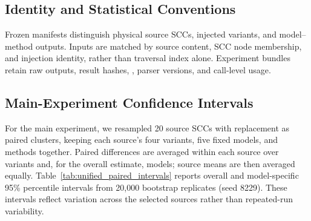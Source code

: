 \subsection{Identity and Statistical Conventions}
\label{app:revision_provenance}

Frozen manifests distinguish physical source SCCs, injected variants, and model--method outputs. Inputs are matched by source content, SCC node membership, and injection identity, rather than traversal index alone. Experiment bundles retain raw outputs, result hashes, , parser versions, and call-level usage.


\begin{revadded}
\ifrevisionmarks\else\newpage\fi
\subsection{Main-Experiment Confidence Intervals}
\label{app:main_confidence_intervals}

For the main experiment, we resampled 20 source SCCs with replacement as paired clusters, keeping each source's four variants, five fixed models, and methods together. Paired differences are averaged within each source over variants and, for the overall estimate, models; source means are then averaged equally. Table~\ref{tab:unified_paired_intervals} reports overall and model-specific 95\% percentile intervals from 20,000 bootstrap replicates (seed 8229). These intervals reflect variation across the selected sources rather than repeated-run variability.


\end{revadded}

